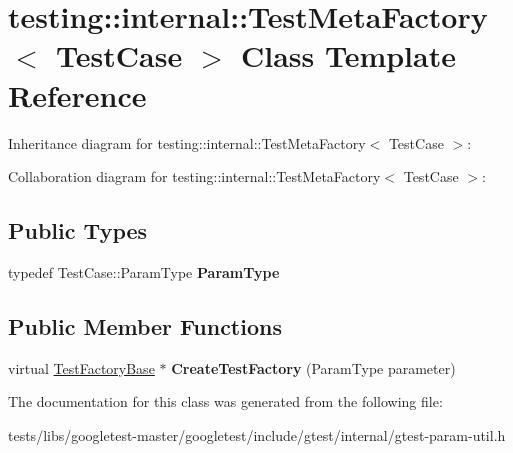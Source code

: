 \hypertarget{classtesting_1_1internal_1_1TestMetaFactory}{}\section{testing\+:\+:internal\+:\+:Test\+Meta\+Factory$<$ Test\+Case $>$ Class Template Reference}
\label{classtesting_1_1internal_1_1TestMetaFactory}


Inheritance diagram for testing\+:\+:internal\+:\+:Test\+Meta\+Factory$<$ Test\+Case $>$\+:


Collaboration diagram for testing\+:\+:internal\+:\+:Test\+Meta\+Factory$<$ Test\+Case $>$\+:
\subsection*{Public Types}
\begin{DoxyCompactItemize}
\item 
\mbox{\label{classtesting_1_1internal_1_1TestMetaFactory_a9c12e442b4389381b948ed669fcf0f84}} 
typedef Test\+Case\+::\+Param\+Type {\bfseries Param\+Type}
\end{DoxyCompactItemize}
\subsection*{Public Member Functions}
\begin{DoxyCompactItemize}
\item 
\mbox{\label{classtesting_1_1internal_1_1TestMetaFactory_ae9f5334c68af309bca8f7ec29d837e38}} 
virtual \hyperlink{classtesting_1_1internal_1_1TestFactoryBase}{Test\+Factory\+Base} $\ast$ {\bfseries Create\+Test\+Factory} (Param\+Type parameter)
\end{DoxyCompactItemize}


The documentation for this class was generated from the following file\+:\begin{DoxyCompactItemize}
\item 
tests/libs/googletest-\/master/googletest/include/gtest/internal/gtest-\/param-\/util.\+h\end{DoxyCompactItemize}
